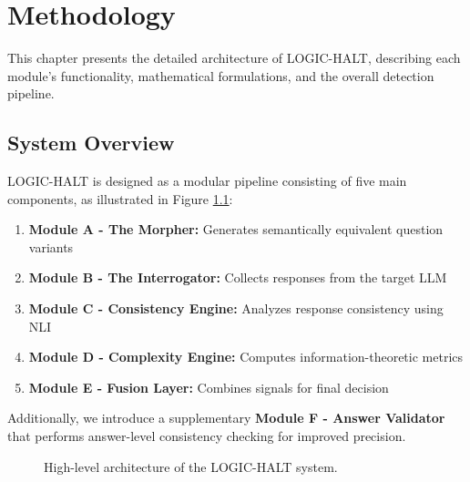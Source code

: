 \chapter{Methodology}

This chapter presents the detailed architecture of LOGIC-HALT, describing each module's functionality, mathematical formulations, and the overall detection pipeline.

\section{System Overview}

LOGIC-HALT is designed as a modular pipeline consisting of five main components, as illustrated in Figure \ref{fig:architecture}:

\begin{enumerate}
    \item \textbf{Module A - The Morpher:} Generates semantically equivalent question variants
    \item \textbf{Module B - The Interrogator:} Collects responses from the target LLM
    \item \textbf{Module C - Consistency Engine:} Analyzes response consistency using NLI
    \item \textbf{Module D - Complexity Engine:} Computes information-theoretic metrics
    \item \textbf{Module E - Fusion Layer:} Combines signals for final decision
\end{enumerate}

Additionally, we introduce a supplementary \textbf{Module F - Answer Validator} that performs answer-level consistency checking for improved precision.

\begin{figure}[!htbp]
    \centering
    \caption{High-level architecture of the LOGIC-HALT system.}
    \label{fig:architecture}
\end{figure}

